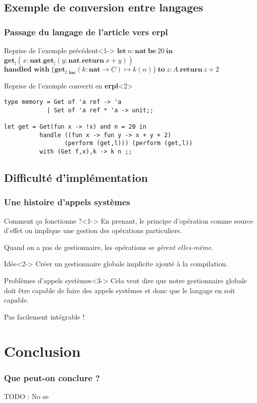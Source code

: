 \documentclass{beamer}
\begin{document}
\subsection{Exemple de conversion entre langages}
\begin{frame}[fragile]
	\frametitle{Passage du langage de l'article vers \textbf{erpl}}

	\begin{exampleblock}{Reprise de l'exemple précédent}<1->
		$\textbf{let}~n:\textbf{nat}~\textbf{be}~20~\textbf{in}$\\
		$\textbf{get}_l(x:\textbf{nat}.\textbf{get}_l(y:\textbf{nat}.\textbf{return}~x+y))$\\
		$\textbf{handled~with}~\{\textbf{get}_{l:\textbf{loc}}(k:\textbf{nat} \rightarrow \underline{C}) \mapsto k(n)\}~\textbf{to}~z:A.\textbf{return}~z+2$
	\end{exampleblock}

	\begin{exampleblock}{Reprise de l'exemple converti en \textbf{erpl}}<2>

		\begin{lstlisting}[language=caml]
type memory = Get of 'a ref -> 'a 
            | Set of 'a ref * 'a -> unit;;

let get = Get(fun x -> !x) and n = 20 in
          handle ((fun x -> fun y -> x + y + 2) 
                 (perform (get,l))) (perform (get,l)) 
          with (Get f,x),k -> k n ;;
		\end{lstlisting}
	\end{exampleblock}
\end{frame}

\subsection{Difficulté d'implémentation}
\begin{frame}
	\frametitle{Une histoire d'appels systèmes}
	\begin{block}{Comment ça fonctionne ?}<1->
		En prenant, le principe d'opération comme source d'effet on implique une gestion des opérations particuliers.

		Quand on a pas de gestionnaire, les opérations se \textit{gèrent elles-même}.
	\end{block}

	\begin{block}{Idée}<2->
		Créer un gestionnaire globale implicite ajouté à la compilation. 
	\end{block}

	\begin{alertblock}{Problèmes d'appels systèmes}<3->
		Cela veut dire que notre
		gestionnaire globale doit être capable de faire des appels systèmes et donc que le langage en soit capable.

		\alert{Pas facilement intégrable !}
	\end{alertblock}
\end{frame}

\section{Conclusion}
\begin{frame}
	\frametitle{Que peut-on conclure ?}
	TODO : No se

	
\end{frame}
\end{document}
